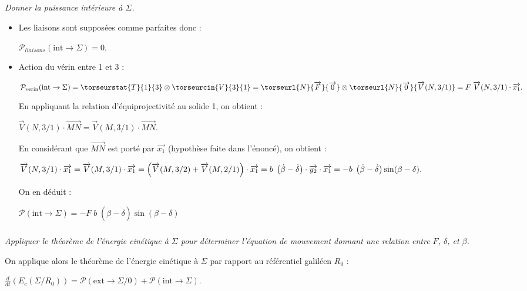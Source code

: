 \begin{multicols}{2}
\subparagraph{}
\textit{Donner la puissance intérieure à $\Sigma$.}
\ifprof
\begin{corrige}
\begin{itemize}
\item Les liaisons sont supposées comme parfaites donc :

$
\mathcal{P}_{liaisons}(\text{int}\rightarrow \Sigma)=0.
$

\item Action du vérin entre 1 et 3 :

$
\mathcal{P}_\text{verin}(\text{int}\rightarrow \Sigma)=\torseurstat{T}{1}{3}\otimes \torseurcin{V}{3}{1}
=\torseurl{N}{\overrightarrow{F}}{\overrightarrow{0}}\otimes \torseurl{N}{\overrightarrow{0}}{\overrightarrow{V}(N,3/1)}
=F\;\overrightarrow{V}(N,3/1)\cdot\overrightarrow{x_1}.
$

En appliquant la relation d'équiprojectivité au solide 1, on obtient :

$
\overrightarrow{V}(N,3/1)\cdot\overrightarrow{MN}=\overrightarrow{V}(M,3/1)\cdot\overrightarrow{MN}.
$

En considérant que $\overrightarrow{MN}$ est porté par $\overrightarrow{x_1}$ (hypothèse faite dans l'énoncé), on obtient :

$
\overrightarrow{V}(N,3/1)\cdot\overrightarrow{x_1}=\overrightarrow{V}(M,3/1)\cdot\overrightarrow{x_1}=\left(\overrightarrow{V}(M,3/2)+\overrightarrow{V}(M,2/1)\right)\cdot\overrightarrow{x_1}\\
=b\;\left(\dot{\beta}-\dot{\delta}\right)\cdot\overrightarrow{y_2}\cdot\overrightarrow{x_1}=-b\;\left(\dot{\beta}-\dot{\delta}\right)\sin(\beta-\delta).
$


On en déduit :

$
\mathcal{P}(\text{int}\rightarrow \Sigma)=-F\;b\;\left(\dot{\beta}-\dot{\delta}\right)\sin(\beta-\delta)
$

\end{itemize}
\end{corrige}
\else
\fi

\subparagraph{}
\textit{Appliquer le théorème de l'énergie cinétique à $\Sigma$ pour déterminer l'équation de mouvement donnant une relation entre $F$, $\delta$, et $\beta$.}
\ifprof
\begin{corrige}
On applique alors le théorème de l'énergie cinétique à $\Sigma$ par rapport au référentiel galiléen $R_0$ :

$
\frac{d}{dt}(E_c(\Sigma/R_0))=\mathcal{P}(\text{ext}\rightarrow \Sigma/0)+\mathcal{P}(\text{int}\rightarrow \Sigma).
$


\end{corrige}
\end{multicols}
